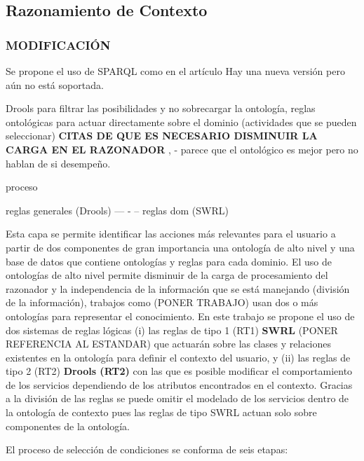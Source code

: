 \subsection{Razonamiento de Contexto}
\label{subsec:Prop_Razonamiento}


\subsubsection{MODIFICACIÓN}
Se propone el uso de SPARQL como en el artículo \cite{Meditskos2013, Meditskos2016}
Hay una nueva versión pero aún no está soportada.


Drools para filtrar las posibilidades y no sobrecargar la ontología, reglas ontológicas para actuar directamente sobre el dominio (actividades que se pueden seleccionar) \textbf{CITAS DE QUE ES NECESARIO DISMINUIR LA CARGA EN EL RAZONADOR} \cite{Ordonez2016}, \cite{Hille} - parece que el ontológico es mejor pero no hablan de si desempeño.

proceso 

reglas generales (Drools) --- - -- reglas dom (SWRL)

Esta capa se permite identificar las acciones más relevantes para el usuario a partir de dos componentes de gran importancia una ontología de alto nivel y una base de datos que contiene ontologías y reglas para cada dominio. El uso de ontologías de alto nivel permite disminuir de la carga de procesamiento del razonador y la independencia de la información que se está manejando (división de la información), trabajos como (PONER TRABAJO) usan dos o más ontologías para representar el conocimiento. En este trabajo se propone el uso de dos sistemas de reglas lógicas (i) las reglas de tipo 1 (RT1) \textbf{SWRL} (PONER REFERENCIA AL ESTANDAR) que actuarán sobre las clases y relaciones existentes en la ontología para definir el contexto del usuario, y (ii) las reglas de tipo 2 (RT2) \textbf{Drools (RT2)} con las que es posible modificar el comportamiento de los servicios dependiendo de los atributos encontrados en el contexto. Gracias a la división de las reglas se puede omitir el modelado de los servicios dentro de la ontología de contexto pues las reglas de tipo SWRL actuan solo sobre componentes de la ontología.

El proceso de selección de condiciones se conforma de seis etapas: 

